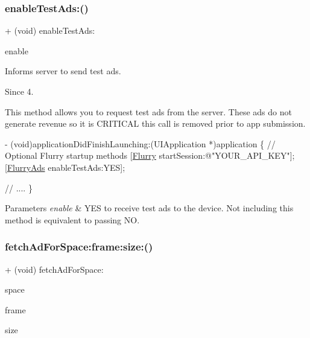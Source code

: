 \subsubsection{\texorpdfstring{enable\+Test\+Ads\+:()}{enableTestAds:()}}
{\footnotesize\ttfamily + (void) enable\+Test\+Ads\+: \begin{DoxyParamCaption}\item[{(B\+O\+OL)}]{enable }\end{DoxyParamCaption}}



Informs server to send test ads. 

\begin{DoxySince}{Since}
4.
\end{DoxySince}
This method allows you to request test ads from the server. These ads do not generate revenue so it is C\+R\+I\+T\+I\+C\+AL this call is removed prior to app submission.


\begin{DoxyCode}
- (void)applicationDidFinishLaunching:(UIApplication *)application 
\{
    \textcolor{comment}{// Optional Flurry startup methods}
    [\hyperlink{interfaceFlurry}{Flurry} startSession:\textcolor{stringliteral}{@"YOUR\_API\_KEY"}];
    [\hyperlink{interfaceFlurryAds}{FlurryAds} enableTestAds:YES];

    \textcolor{comment}{// ....}
\}
\end{DoxyCode}



\begin{DoxyParams}{Parameters}
{\em enable} & Y\+ES to receive test ads to the device. Not including this method is equivalent to passing NO. \\
\hline
\end{DoxyParams}
\mbox{\label{interfaceFlurryAds_a7eb674e15673f908467be52017169368}} 
\subsubsection{\texorpdfstring{fetch\+Ad\+For\+Space\+:frame\+:size\+:()}{fetchAdForSpace:frame:size:()}}
{\footnotesize\ttfamily + (void) fetch\+Ad\+For\+Space\+: \begin{DoxyParamCaption}\item[{(N\+S\+String $\ast$)}]{space }\item[{frame:(C\+G\+Rect)}]{frame }\item[{size:(Flurry\+Ad\+Size)}]{size }\end{DoxyParamCaption}}



